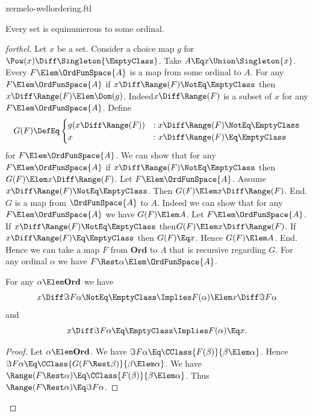 \documentclass{stex}
\newcommand\Ordinals{\textbf{Ord}}
\begin{document}
\begin{smodule}{zermelo-wellordering.ftl}
\begin{theorem}[forthel,title=Zermelo's Well-Ordering Theorem,name=Zermelo]
  Every set is equinumerous to some ordinal.
\end{theorem}
\begin{proof}[forthel]
  Let $x$ be a set.
  Consider a choice map $g$ for $\Pow(x) \Diff \Singleton{\EmptyClass}$.
  Take $A \Eq x \Union \Singleton{x}$.
  Every $F \Elem \OrdFunSpace{A}$ is a map from some ordinal to $A$.
  For any $F \Elem \OrdFunSpace{A}$ if $x \Diff \Range(F) \NotEq \EmptyClass$ then $x \Diff \Range(F) \Elem \Dom(g)$.
  Indeed\linebreak $x \Diff \Range(F)$ is a subset of $x$ for any $F \Elem \OrdFunSpace{A}$.
  Define \[ G(F) \DefEq
    \begin{cases}
      g(x \Diff \Range(F))
      & : x \Diff \Range(F) \NotEq \EmptyClass
      \\
      x
      & : x \Diff \Range(F) \Eq \EmptyClass
    \end{cases} \]
  for $F \Elem \OrdFunSpace{A}$.
  We can show that for any $F \Elem \OrdFunSpace{A}$ if $x \Diff \Range(F) \NotEq \EmptyClass$ then $G(F) \Elem x \Diff \Range(F)$.
    Let $F \Elem \OrdFunSpace{A}$.
    Assume $x \Diff \Range(F) \NotEq \EmptyClass$.  
    Then $G(F) \Elem x \Diff \Range(F)$.
  End.
  $G$ is a map from $\OrdFunSpace{A}$ to $A$.
  Indeed we can show that for any $F \Elem \OrdFunSpace{A}$ we have $G(F) \Elem A$.
    Let $F \Elem \OrdFunSpace{A}$.
    If $x \Diff \Range(F) \NotEq \EmptyClass$ then\linebreak $G(F) \Elem x \Diff \Range(F)$.
    If $x \Diff \Range(F) \Eq \EmptyClass$ then $G(F) \Eq x$.
    Hence $G(F) \Elem A$.
  End.
  Hence we can take a map $F$ from $\Ordinals$ to $A$ that is recursive regarding $G$.
  For any ordinal $\alpha$ we have $F \Rest \alpha \Elem \OrdFunSpace{A}$.

  For any $\alpha \Elem \Ordinals$ we have
  \[ x \Diff \Im{F}{\alpha} \NotEq \EmptyClass \Implies F(\alpha) \Elem x \Diff \Im{F}{\alpha} \]
  and
  \[ x \Diff \Im{F}{\alpha} \Eq \EmptyClass \Implies F(\alpha) \Eq x. \]
  \begin{proof}
    Let $\alpha \Elem \Ordinals$.
    We have $\Im{F}{\alpha} \Eq \CClass{F(\beta)}{\beta \Elem \alpha}$.
    Hence $\Im{F}{\alpha} \Eq \CClass{G(F \Rest \beta)}{\beta \Elem \alpha}$.
    We have $\Range(F \Rest \alpha) \Eq \CClass{F(\beta)}{\beta \Elem \alpha}$.
    Thus\linebreak $\Range(F \Rest \alpha) \Eq \Im{F}{\alpha}$.


\end{proof}
\end{proof}
\end{smodule}
\end{document}
